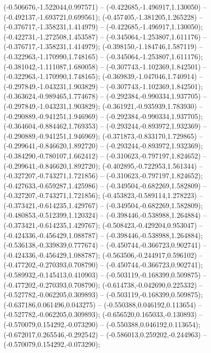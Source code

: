  (-0.506676,-1.522044,0.997571) -- (-0.422685,-1.496917,1.130050) -- (-0.492137,-1.693721,0.699561);
 (-0.457405,-1.381205,1.265228) -- (-0.376717,-1.358231,1.414979) -- (-0.422685,-1.496917,1.130050);
 (-0.422731,-1.272508,1.453587) -- (-0.345064,-1.253807,1.611176) -- (-0.376717,-1.358231,1.414979);
 (-0.398150,-1.184746,1.587119) -- (-0.322963,-1.170990,1.748165) -- (-0.345064,-1.253807,1.611176);
 (-0.381042,-1.111087,1.680058) -- (-0.307743,-1.102369,1.842501) -- (-0.322963,-1.170990,1.748165);
 (-0.369839,-1.047046,1.740914) -- (-0.297849,-1.043231,1.903829) -- (-0.307743,-1.102369,1.842501);
 (-0.363624,-0.989465,1.774678) -- (-0.292384,-0.990334,1.937705) -- (-0.297849,-1.043231,1.903829);
 (-0.361921,-0.935939,1.783930) -- (-0.290889,-0.941251,1.946969) -- (-0.292384,-0.990334,1.937705);
 (-0.364604,-0.884462,1.769353) -- (-0.293244,-0.893972,1.932369) -- (-0.290889,-0.941251,1.946969);
 (-0.371873,-0.833170,1.729865) -- (-0.299641,-0.846620,1.892720) -- (-0.293244,-0.893972,1.932369);
 (-0.384290,-0.780107,1.662412) -- (-0.310623,-0.797197,1.824652) -- (-0.299641,-0.846620,1.892720);
 (-0.402895,-0.722953,1.561344) -- (-0.327207,-0.743271,1.721856) -- (-0.310623,-0.797197,1.824652);
 (-0.427633,-0.659287,1.425986) -- (-0.349504,-0.682269,1.582809) -- (-0.327207,-0.743271,1.721856);
 (-0.453823,-0.589114,1.278223) -- (-0.373421,-0.614235,1.429767) -- (-0.349504,-0.682269,1.582809);
 (-0.480853,-0.512399,1.120324) -- (-0.398446,-0.538988,1.264884) -- (-0.373421,-0.614235,1.429767);
 (-0.508423,-0.429204,0.953047) -- (-0.424336,-0.456429,1.088787) -- (-0.398446,-0.538988,1.264884);
 (-0.536138,-0.339839,0.777674) -- (-0.450744,-0.366723,0.902741) -- (-0.424336,-0.456429,1.088787);
 (-0.563506,-0.244917,0.596102) -- (-0.477202,-0.270393,0.708790) -- (-0.450744,-0.366723,0.902741);
 (-0.589932,-0.145413,0.410903) -- (-0.503119,-0.168399,0.509875) -- (-0.477202,-0.270393,0.708790);
 (-0.614738,-0.042690,0.225332) -- (-0.527782,-0.062205,0.309893) -- (-0.503119,-0.168399,0.509875);
 (-0.637186,0.061496,0.043275) -- (-0.550388,0.046192,0.113654) -- (-0.527782,-0.062205,0.309893);
 (-0.656520,0.165033,-0.130893) -- (-0.570079,0.154292,-0.073290) -- (-0.550388,0.046192,0.113654);
 (-0.672017,0.265546,-0.292542) -- (-0.586013,0.259202,-0.244963) -- (-0.570079,0.154292,-0.073290);
